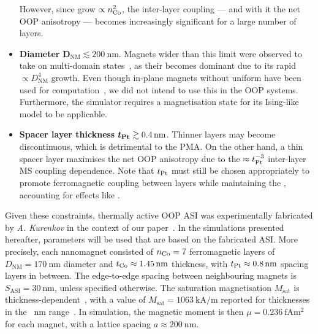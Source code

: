 \begin{itemize}
	However, since  grow $\propto n_{\ce{Co}}^2$, the inter-layer coupling --- and with it the net OOP anisotropy --- becomes increasingly significant for a large number of layers.
	\item \textbf{Diameter} $\boldsymbol{D_\mathrm{NM}} \lesssim \SI{200}{\nano\metre}$. \newline
	Magnets wider than this limit were observed to take on multi-domain states~\cite{KUR-24}, as their  becomes dominant due to its rapid $\propto D_\mathrm{NM}^4$ growth.
	Even though in-plane magnets without uniform  have been used for computation~\cite{gartside2022reconfigurable}, we did not intend to use this in the OOP systems.
	Furthermore, the \hotspice simulator requires a  magnetisation state for its Ising-like model to be applicable. %
	\item \textbf{Spacer layer thickness} $\boldsymbol{t_{\ce{Pt}}} \gtrsim \SI{0.4}{\nano\metre}$. \newline
	Thinner layers may become discontinuous, which is detrimental to the PMA.
	On the other hand, a thin spacer layer maximises the net OOP anisotropy due to the $\approx t_{\ce{Pt}}^{-3}$ inter-layer MS coupling dependence.
	Note that $t_{\ce{Pt}}$ must still be chosen appropriately to promote ferromagnetic coupling between layers while maintaining the , accounting for effects like .
\end{itemize}

Given these constraints, thermally active OOP ASI was experimentally fabricated by \textit{A. Kurenkov} in the context of our paper~\cite{KUR-24}.
In the simulations presented hereafter, parameters will be used that are based on the fabricated ASI.
More precisely, each nanomagnet consisted of $n_{\ce{Co}}=7$ ferromagnetic layers of $D_\mathrm{NM}=\SI{170}{\nano\metre}$ diameter and $t_{\ce{Co}} \approx \SI{1.45}{\nano\metre}$ thickness, with $t_{\ce{Pt}} \approx \SI{0.8}{\nano\metre}$ spacing layers in between.
The edge-to-edge spacing between neighbouring magnets is $S_\mathrm{ASI}=\SI{30}{\nano\metre}$, unless specified otherwise.
The saturation magnetisation $M_\mathrm{sat}$ is thickness-dependent~\cite{CoFilmPropertiesCVD}, with a value of $M_\mathrm{sat}=\SI{1063}{\kilo\ampere\per\metre}$ reported for thicknesses in the \SI{}{\nano\metre} range~\cite{Msat_Co}.
In simulation, the magnetic moment is then $\mu = \SI{0.236}{\femto\ampere\metre\squared}$ for each magnet, with a lattice spacing $a \approx \SI{200}{\nano\metre}$. %

